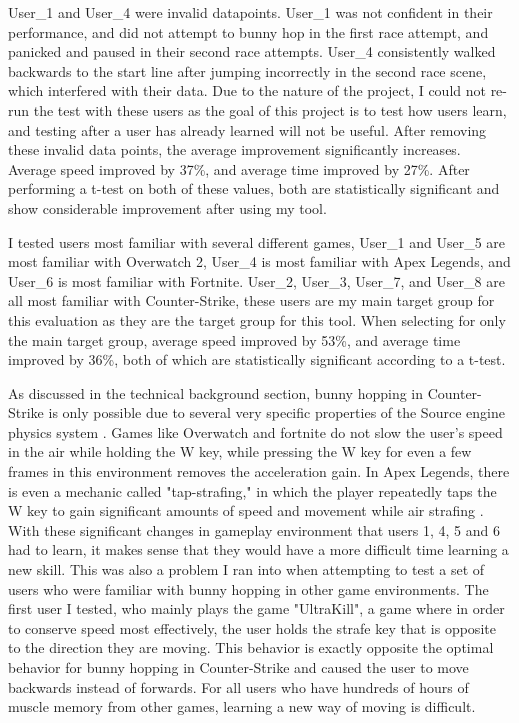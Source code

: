 \documentclass[10pt,twocolumn]{article}
\begin{document}
User\_1 and User\_4 were invalid datapoints. User\_1 was not confident in their performance, and did not attempt to bunny hop in the first race attempt, and panicked and paused in their second race attempts. User\_4 consistently walked backwards to the start line after jumping incorrectly in the second race scene, which interfered with their data. Due to the nature of the project, I could not re-run the test with these users as the goal of this project is to test how users learn, and testing after a user has already learned will not be useful. After removing these invalid data points, the average improvement significantly increases. Average speed improved by 37\%, and average time improved by 27\%. After performing a t-test on both of these values, both are statistically significant and show considerable improvement after using my tool.

I tested users most familiar with several different games, User\_1 and User\_5 are most familiar with Overwatch 2, User\_4 is most familiar with Apex Legends, and User\_6 is most familiar with Fortnite.  User\_2, User\_3, User\_7, and User\_8 are all most familiar with Counter-Strike, these users are my main target group for this evaluation as they are the target group for this tool. When selecting for only the main target group, average speed improved by 53\%, and average time improved by 36\%, both of which are statistically significant according to a t-test. 

As discussed in the technical background section, bunny hopping in Counter-Strike is only possible due to several very specific properties of the Source engine physics system \cite{BunnyHoppingProgrammers}. Games like Overwatch and fortnite do not slow the user's speed in the air while holding the W key, while pressing the W key for even a few frames in this environment removes the acceleration gain. In Apex Legends, there is even a mechanic called "tap-strafing," in which the player repeatedly taps the W key to gain significant amounts of speed and movement while air strafing \cite{TapStrafing}. With these significant changes in gameplay environment that users 1, 4, 5 and 6 had to learn, it makes sense that they would have a more difficult time learning a new skill. This was also a problem I ran into when attempting to test a set of users who were familiar with bunny hopping in other game environments. The first user I tested, who mainly plays the game "UltraKill", a game where in order to conserve speed most effectively, the user holds the strafe key that is opposite to the direction they are moving. This behavior is exactly opposite the optimal behavior for bunny hopping in Counter-Strike and caused the user to move backwards instead of forwards. For all users who have hundreds of hours of muscle memory from other games, learning a new way of moving is difficult.
\end{document}
